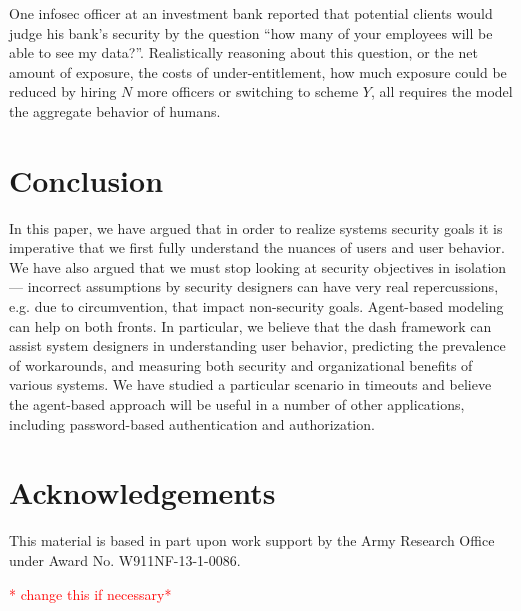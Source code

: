 \documentclass{acm_proc_article-sp}
\newcommand{\ignore}[1] {}
\begin{document}
One infosec officer at an investment bank reported that potential
clients would judge his bank's security by the question ``how many of
your employees will be able to see my data?''.  Realistically
reasoning about this question, or the net amount of exposure, the
costs of under-entitlement, how much exposure could be reduced by
hiring $N$ more officers or switching to scheme $Y$, all requires the
model the aggregate behavior of humans.



\ignore{(Indeed, X.509 PKI has often been lamented as costing too many
man-hours when deployed in practice, in large enterprises.  Could our
approach help explain this, and then help guide designers to reduce
these costs?)}

\ignore{BCMA....}

\section{Conclusion}
\label{sec-conclusion}

In this paper, we have argued that in order to realize systems
security goals it is imperative that we first fully understand the
nuances of users and user behavior.  We have also argued that we must
stop looking at security objectives in isolation --- incorrect
assumptions by security designers can have very real repercussions,
e.g. due to circumvention, that impact non-security goals. Agent-based
modeling can help on both fronts. In particular, we believe that the
{\sc dash} framework can assist system designers in understanding user
behavior, predicting the prevalence of workarounds, and measuring both
security and organizational benefits of various systems. We have
studied a particular scenario in timeouts and believe the agent-based
approach will be useful in a number of other applications, including
password-based authentication and authorization.

\section{Acknowledgements}
\label{sec-acks}

This material is based in part upon work support by the Army Research Office under Award No. W911NF-13-1-0086.

\textcolor{red}{* change this if necessary*}

\small

\nocite{*}



\end{document}
